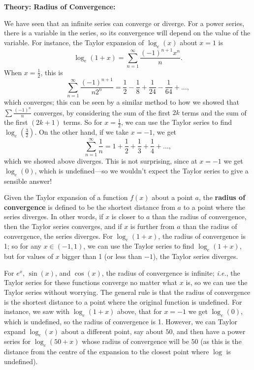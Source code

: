 \documentclass{article}
\begin{document}
\clearpage




\textbf{Theory: Radius of Convergence:}

\vspace{5mm}


We have seen that an infinite series can converge or diverge. For a power series, there is a variable in the series, so its convergence will depend on the value of the variable. For instance, the Taylor expansion of $\log_e(x)$ about $x=1$ is
\[\log_e(1+x)=\sum_{n=1}^\infty \frac{(-1)^{n+1}x^n}{n}.\]
When $x=\frac{1}{2}$, this is
\[\sum_{n=1}^\infty \frac{(-1)^{n+1}}{n2^n}=\frac{1}{2}-\frac{1}{8}+\frac{1}{24}-\frac{1}{64}+...,\]
which converges; this can be seen by a similar method to how we showed that $\sum\frac{(-1)^n}{n}$ converges, by considering the sum of the first $2k$ terms and the sum of the first $(2k+1)$ terms. So for $x=\frac{1}{2}$, we can use the Taylor series to find $\log_e\left(\frac{3}{2}\right)$. On the other hand, if we take $x=-1$, we get
\[\sum_{n=1}^\infty \frac{1}{n}=1+\frac{1}{2}+\frac{1}{3}+\frac{1}{4}+\hdots,\]
which we showed above diverges. This is not surprising, since at $x=-1$ we get $\log_e(0)$, which is undefined---so we wouldn't expect the Taylor series to give a sensible answer!

Given the Taylor expansion of a function $f(x)$ about a point $a$, the \textbf{radius of convergence} is defined to be the shortest distance from $a$ to a point where the series diverges. In other words, if $x$ is closer to $a$ than the radius of convergence, then the Taylor series converges, and if $x$ is further from $a$ than the radius of convergence, the series diverges. For $\log_e(1+x)$, the radius of convergence is 1; so for any $x\in(-1,1)$, we can use the Taylor series to find $\log_e(1+x)$, but for values of $x$ bigger than 1 (or less than $-1$), the Taylor series diverges.

For $e^x$, $\sin(x)$, and $\cos(x)$, the radius of convergence is infinite; \textit{i.e.}, the Taylor series for these functions converge no matter what $x$ is, so we can use the Taylor series without worrying. The general rule is that the radius of convergence is the shortest distance to a point where the original function is undefined. For instance, we saw with $\log_e(1+x)$ above, that for $x=-1$ we get $\log_e(0)$, which is undefined, so the radius of convergence is 1. However, we can Taylor expand $\log_e(x)$ about a different point, say about $50$, and then have a power series for $\log_e(50+x)$ whose radius of convergence will be $50$ (as this is the distance from the centre of the expansion to the closest point where $\log$ is undefined).
\end{document}
